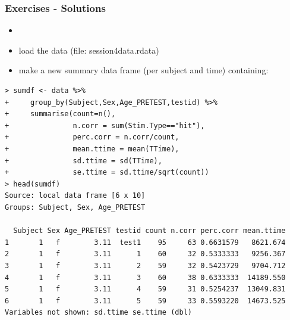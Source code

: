 \documentclass[xcolor={table}]{beamer}
\begin{document}
\begin{frame}\frametitle{Exercises - Solutions} 
    \begin{itemize}
    \item \item load the data (file: session4data.rdata)
    \item make a new summary data frame (per subject and time) containing:
    \end{itemize}\footnotesize
\begin{verbatim}
> sumdf <- data %>%
+     group_by(Subject,Sex,Age_PRETEST,testid) %>%
+     summarise(count=n(),
+               n.corr = sum(Stim.Type=="hit"),
+               perc.corr = n.corr/count,
+               mean.ttime = mean(TTime),
+               sd.ttime = sd(TTime),
+               se.ttime = sd.ttime/sqrt(count))
> head(sumdf)
Source: local data frame [6 x 10]
Groups: Subject, Sex, Age_PRETEST

  Subject Sex Age_PRETEST testid count n.corr perc.corr mean.ttime 
1       1   f        3.11  test1    95     63 0.6631579   8621.674 
2       1   f        3.11      1    60     32 0.5333333   9256.367 
3       1   f        3.11      2    59     32 0.5423729   9704.712 
4       1   f        3.11      3    60     38 0.6333333  14189.550 
5       1   f        3.11      4    59     31 0.5254237  13049.831 
6       1   f        3.11      5    59     33 0.5593220  14673.525 
Variables not shown: sd.ttime se.ttime (dbl)  
\end{verbatim}
\end{frame}
\end{document}
